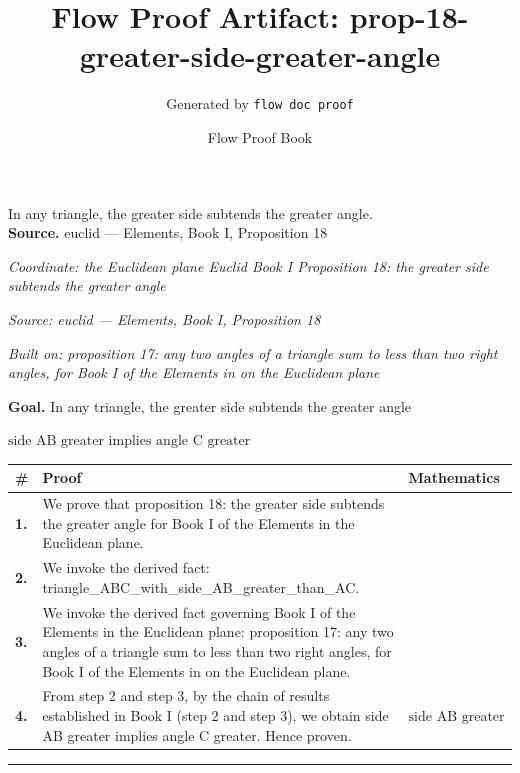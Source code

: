 \documentclass[11pt]{article}
\title{Flow Proof Artifact: prop-18-greater-side-greater-angle}
\author{Generated by \texttt{flow doc proof}}
\date{Flow Proof Book}
\theoremstyle{definition}
\begin{document}
\maketitle
In any triangle, the greater side subtends the greater angle.\\[0.5em]
\textbf{Source.} euclid — Elements, Book I, Proposition 18\\[0.5em]
\bigskip
{}\par
\smallskip\noindent\textit{Coordinate: the Euclidean plane \cdot Euclid Book I \cdot Proposition 18: the greater side subtends the greater angle}\par
\smallskip\noindent\textit{Source: euclid — Elements, Book I, Proposition 18}\par
\smallskip\noindent\textit{Built on: proposition 17: any two angles of a triangle sum to less than two right angles, for Book I of the Elements in on the Euclidean plane}\par
\medskip
\noindent\textbf{Goal.} In any triangle, the greater side subtends the greater angle\par
\noindent$\displaystyle \text{side AB greater implies angle C greater}$\par
\medskip
\noindent
\begin{tabular}{@{} >{\raggedright\arraybackslash}p{} >{\raggedright\arraybackslash}p{} >{\raggedleft\arraybackslash}p{} @{}}
\textbf{\#} & \textbf{Proof} & \textbf{Mathematics} \\
\midrule
\textbf{1.} & We prove that proposition 18: the greater side subtends the greater angle for Book I of the Elements in the Euclidean plane. & \\[0.45em]
\textbf{2.} & We invoke the derived fact: triangle\_ABC\_with\_side\_AB\_greater\_than\_AC. & \\[0.45em]
\textbf{3.} & We invoke the derived fact governing Book I of the Elements in the Euclidean plane: proposition 17: any two angles of a triangle sum to less than two right angles, for Book I of the Elements in on the Euclidean plane. & \\[0.45em]
\textbf{4.} & From step 2 and step 3, by the chain of results established in Book I (step 2 and step 3), we obtain side AB greater implies angle C greater. Hence proven. & $\displaystyle \text{side AB greater implies angle C greater}$ \\[0.45em]
\bottomrule
\end{tabular}
\label{thm:Geometry-Euclid Book I-proposition_18_the_greater_side_subtends_the_greater_angle}
\par\medskip\hrule
\end{document}
